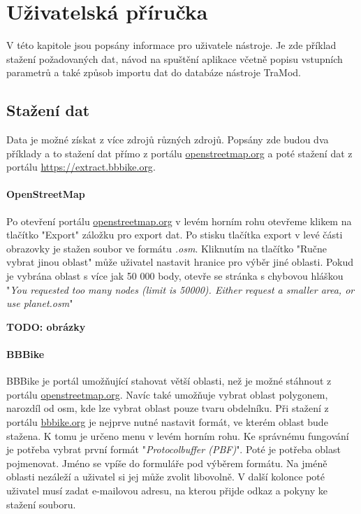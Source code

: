 \chapter{Uživatelská příručka}

V této kapitole jsou popsány informace pro uživatele nástroje. Je zde příklad stažení požadovaných dat, návod na spuštění aplikace včetně popisu vstupních parametrů a také způsob importu dat do databáze nástroje TraMod. 

\section{Stažení dat}

Data je možné získat z více zdrojů různých zdrojů. Popsány zde budou dva příklady a to stažení dat přímo z portálu \url{openstreetmap.org} a poté stažení dat z portálu \url{https://extract.bbbike.org}.

\subsubsection{OpenStreetMap}

Po otevření portálu \url{openstreetmap.org} v levém horním rohu otevřeme klikem na tlačítko "Export" záložku pro export dat. Po stisku tlačítka export v levé části obrazovky je stažen soubor ve formátu \textit{.osm}. Kliknutím na tlačítko "Ručne vybrat jinou oblast" může uživatel nastavit hranice pro výběr jiné oblasti. Pokud je vybrána oblast s více jak 50 000 body, otevře se stránka s chybovou hláškou "\textit{You requested too many nodes (limit is 50000). Either request a smaller area, or use planet.osm}"

\textbf{TODO: obrázky}

\subsubsection{BBBike}

BBBike je portál umožňující stahovat větší oblasti, než je možné stáhnout z portálu \url{openstreetmap.org}. Navíc také umožňuje vybrat oblast polygonem, narozdíl od osm, kde lze vybrat oblast pouze tvaru obdelníku. Při stažení z portálu \url{bbbike.org} je nejprve nutné nastavit formát, ve kterém oblast bude stažena. K tomu je určeno menu v levém horním rohu. Ke správnému fungování je potřeba vybrat první formát "\textit{Protocolbuffer (PBF)}". Poté je potřeba oblast pojmenovat. Jméno se vpíše do formuláře pod výběrem formátu. Na jméně oblasti nezáleží a uživatel si jej může zvolit libovolně. V další kolonce poté uživatel musí zadat e-mailovou adresu, na kterou přijde odkaz a pokyny ke stažení souboru.


